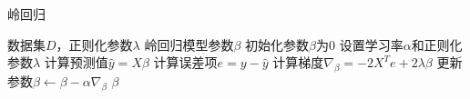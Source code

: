 \documentclass{article}
\begin{document}
	
	\begin{algorithm}
		\caption{岭回归}
		\begin{algorithmic}[1]
			\Require 数据集$D$，正则化参数$\lambda$
			\Ensure 岭回归模型参数$\beta$
			\State 初始化参数$\beta$为0
			\State 设置学习率$\alpha$和正则化参数$\lambda$
			\State 计算预测值$\hat{y} = X\beta$
			\State 计算误差项$e = y - \hat{y}$
			\State 计算梯度$\nabla_{\beta} = -2X^T e + 2\lambda \beta$
			\State 更新参数$\beta \leftarrow \beta - \alpha \nabla_{\beta}$
			\EndWhile
			\State \Return $\beta$
		\end{algorithmic}
	\end{algorithm}
	
\end{document}
